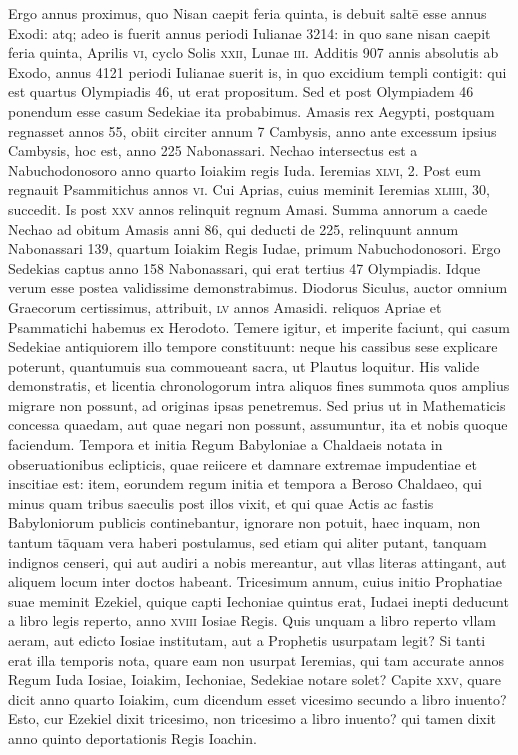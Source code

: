 \begin{parnumbers}
{}
Ergo annus proximus, quo Nisan caepit feria
quinta, is debuit saltē esse annus Exodi: atq; adeo is fuerit annus periodi
Iulianae 3214: in quo sane nisan caepit feria quinta, Aprilis \textsc{vi},
cyclo Solis \textsc{xxii}, Lunae \textsc{iii}.
\lnr{}Additis 907 annis absolutis ab Exodo,
annus 4121 periodi Iulianae suerit is, in quo excidium templi contigit:
qui est quartus Olympiadis 46, ut erat propositum.
\lnr{}Sed et post
Olympiadem 46 ponendum esse casum Sedekiae ita probabimus.
\lnr{}Amasis rex Aegypti, postquam regnasset annos 55, obiit circiter annum
7 Cambysis, anno ante excessum ipsius Cambysis, hoc est, anno
225  Nabonassari.
\lnr{}Nechao intersectus est a Nabuchodonosoro anno
quarto Ioiakim regis Iuda.
\lnr{}Ieremias \textsc{xlvi}, 2.
\lnr{}Post eum regnauit
Psammitichus annos \textsc{vi}.
\lnr{}Cui Aprias, cuius meminit Ieremias
\textsc{xliiii}, 30, succedit.
\lnr{}Is post \textsc{xxv} annos relinquit regnum Amasi.
\lnr{}Summa annorum a caede Nechao ad obitum Amasis anni 86, qui
deducti de 225, relinquunt annum Nabonassari 139, quartum Ioiakim
Regis Iudae, primum Nabuchodonosori.
\lnr{}Ergo Sedekias captus
anno 158 Nabonassari, qui erat tertius 47 Olympiadis.
\lnr{}Idque verum
esse postea validissime demonstrabimus.
\lnr{}Diodorus Siculus,
auctor omnium Graecorum certissimus, attribuit, \textsc{lv} annos Amasidi.
reliquos Apriae et Psammatichi habemus ex Herodoto.
\lnr{}Temere
igitur, et imperite faciunt, qui casum Sedekiae antiquiorem illo
tempore constituunt: neque his cassibus sese explicare poterunt,
quantumuis sua commoueant sacra, ut Plautus loquitur.
\lnr{}His valide
demonstratis, et licentia chronologorum intra aliquos fines summota
quos amplius migrare non possunt, ad originas ipsas penetremus.
\lnr{}Sed prius ut in Mathematicis concessa quaedam, aut quae negari
non possunt, assumuntur, ita et nobis quoque faciendum.
\lnr{}Tempora et initia Regum Babyloniae a Chaldaeis notata in obseruationibus
eclipticis, quae reiicere et damnare extremae impudentiae et
inscitiae est: item, eorundem regum initia et tempora a Beroso Chaldaeo,
qui minus quam tribus saeculis post illos vixit, et qui quae Actis
ac fastis Babyloniorum publicis continebantur, ignorare non potuit,
haec inquam, non tantum tāquam vera haberi postulamus, sed etiam
qui aliter putant, tanquam indignos censeri, qui aut audiri a nobis
mereantur, aut vllas literas attingant, aut aliquem locum inter
doctos habeant.
\lnr{}Tricesimum annum, cuius initio Prophatiae suae
meminit Ezekiel, quique capti Iechoniae quintus erat, Iudaei inepti
deducunt a libro legis reperto, anno \textsc{xviii} Iosiae Regis.
\lnr{}Quis unquam a libro reperto vllam aeram, aut edicto Iosiae institutam, aut a
Prophetis usurpatam legit?
\lnr{}Si tanti erat illa temporis nota, quare
eam non usurpat Ieremias, qui tam accurate annos Regum Iuda Iosiae,
Ioiakim, Iechoniae, Sedekiae notare solet?
\lnr{}Capite \textsc{xxv}, quare dicit
anno quarto Ioiakim, cum dicendum esset vicesimo secundo a libro
inuento?
\lnr{}Esto, cur Ezekiel dixit tricesimo, non tricesimo a libro inuento?
\lnr{}qui tamen dixit anno quinto deportationis Regis Ioachin.


\end{parnumbers}
